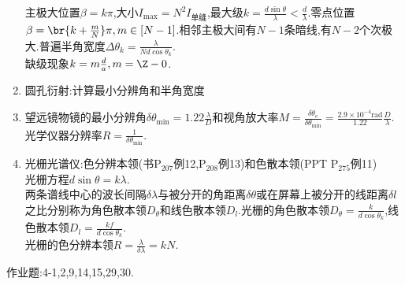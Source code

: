 \documentclass{article}
\begin{document}
\begin{enumerate}
    主极大位置$\beta=k\pi$,大小$I_{\max}=N^2I_{\text{单缝}}$,最大级$k=\frac{d\sin\theta}{\lambda}<\frac{d}{\lambda}$.零点位置$\beta=\br{k+\frac{m}{N}}\pi,m\in [N-1]$.相邻主极大间有$N-1$条暗线,有$N-2$个次极大.普遍半角宽度$\Delta\theta_k=\frac{\lambda}{Nd\cos\theta_k}$.\\
    缺级现象$k=m\frac{d}{a},m=\Z-0$.
    \item 圆孔衍射:计算最小分辨角和半角宽度
    \item 望远镜物镜的最小分辨角$\delta\theta_{\min}=1.22\frac{\lambda}{D}$和视角放大率$M=\frac{\delta\theta_{\text{e}}}{\delta\theta_{\min}}=\frac{2.9\times10^{-4}\text{rad}}{1.22}\frac{D}{\lambda}$.光学仪器分辨率$R=\frac{1}{\delta\theta_{\min}}$.
    \item 光栅光谱仪:色分辨本领(书P$_{207}$例12,P$_{208}$例13)和色散本领(PPT P$_{275}$例11)\\
    光栅方程$d\sin\theta=k\lambda$.\\
    两条谱线中心的波长间隔$\delta\lambda$与被分开的角距离$\delta\theta$或在屏幕上被分开的线距离$\delta l$之比分别称为角色散本领$D_\theta$和线色散本领$D_l$.光栅的角色散本领$D_\theta=\frac{k}{d\cos\theta_k}$,线色散本领$D_l=\frac{kf}{d\cos\theta_k}$.\\
    光栅的色分辨本领$R=\frac{\lambda}{\delta\lambda}=kN$.
\end{enumerate}
作业题:4-1,2,9,14,15,29,30.
\addtocounter{section}{1}
\end{document}
